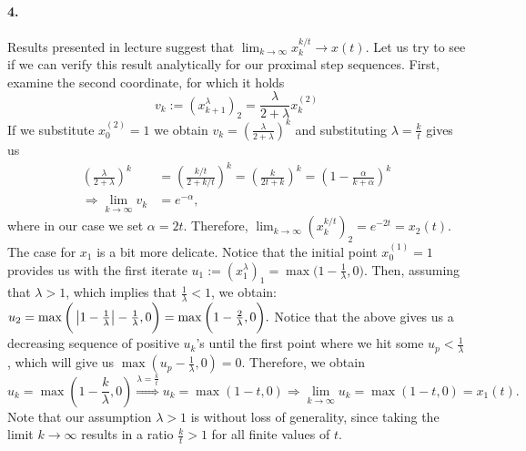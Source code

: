 \documentclass[10pt]{article}
\begin{document}
\begin{Exercise}
    \paragraph{4.}
        Results presented in lecture suggest that $\lim_{k \to \infty}
        x_{k}^{k/t} \to x(t)$. Let us try to see if we can verify this result
        analytically for our proximal step sequences. First, examine the
        second coordinate, for which it holds
        \[
            v_{k} := {(x_{k+1}^{\lambda})}_2 = \frac{\lambda}{2 +
            \lambda} x_k^{(2)}
        \]
        If we substitute $x^{(2)}_0 = 1$ we obtain
        \( v_k = \left( \frac{\lambda}{2 + \lambda} \right)^{k} \)
        and substituting $\lambda = \frac{k}{t}$ gives us
        \begin{align*}
            \left( \frac{\lambda}{2 + \lambda} \right)^k &=
                \left( \frac{k/t}{2 + k/t} \right)^k =
                \left( \frac{k}{2t + k} \right)^k =
                \left(1 - \frac{\alpha}{k + \alpha}\right)^k \\
            \Rightarrow \lim_{k \to \infty} v_k &= e^{-\alpha},
        \end{align*}
        where in our case we set $\alpha = 2t$. Therefore,
        \( \lim_{k \to \infty} \left( x_{k}^{k/t} \right)_2 = e^{-2t} = x_2(t)
        \).
        The case for $x_1$ is a bit more delicate. Notice that the initial point
        $x_0^{(1)} = 1$ provides us with the first iterate
        \( u_1 := \left( x^{\lambda}_{1} \right)_1 =
           \max\big(1 - \frac{1}{\lambda}, 0\big) \).
        Then, assuming that $\lambda > 1$, which implies that $\frac{1}{\lambda}
        < 1$, we obtain:
        \(
            u_2 = \max\bigg( \left| 1 - \frac{1}{\lambda} \right| - \frac{1}{\lambda}, 0
            \bigg) = \max\bigg( 1 - \frac{2}{\lambda}, 0 \bigg).
        \)
        Notice that the above gives us a decreasing sequence of positive $u_k$'s
        until the first point where we hit some $u_{p} < \frac{1}{\lambda}$,
        which will give us $\max\left(u_p - \frac{1}{\lambda}, 0\right) = 0$.
        Therefore, we obtain
        \[
            u_k = \max\left(1 - \frac{k}{\lambda}, 0\right)
            \overset{\lambda=\frac{k}{t}}{\Rightarrow} u_k
            = \max\left(1 - t, 0\right) \Rightarrow
            \lim_{k \to \infty} u_k = \max(1 - t, 0) = x_1(t).
        \]
        Note that our assumption $\lambda > 1$ is without loss of generality,
        since taking the limit $k \to \infty$ results in a ratio $\frac{k}{t} >
        1$ for all finite values of $t$.
\end{Exercise}
\end{document}
